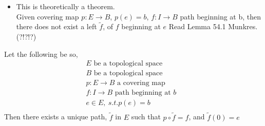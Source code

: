    \begin{itemize}
        \item 
            This is theoretically a theorem.\\
            Given covering map $p:E\rightarrow B$, $p(e)=b$,
            $f:I \rightarrow B$ path beginning at b, then there does not exist a left $\tilde{f}$,
            of $f$ beginning at $e$ Read Lemma 54.1 Munkres. (?!?!?)
    \end{itemize}
    \begin{theorem}
        Let the following be so,
        \begin{align*}
            E \text{ be a topological space}\\
            B \text{ be a topological space}\\
            p:E \rightarrow B \text{ a covering map}\\
            f:I \rightarrow B \text{ path beginning at $b$ }\\
            e \in E,\ s.t. p(e)=b\\
        \end{align*}
        Then there exists a unique path, $\tilde{f}$ in $E$ such that $p\circ \tilde{f}=f$, and
        $\tilde{f}(0)=e$
    \end{theorem}
